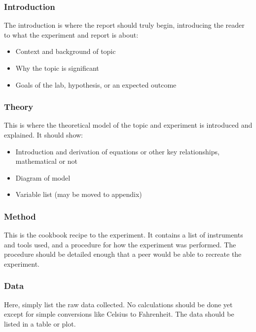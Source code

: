 \documentclass{bannerReport}
\begin{document}
			\subsubsection{Introduction}
				The introduction is where the report should truly begin, introducing the reader to what the experiment and report is about:
				\begin{itemize}
					\item Context and background of topic
					\item Why the topic is significant
					\item Goals of the lab, hypothesis, or an expected outcome
				\end{itemize}

			\subsubsection{Theory}
				This is where the theoretical model of the topic and experiment is introduced and explained. It should show:
				\begin{itemize}
					\item Introduction and derivation of equations or other key relationships, mathematical or not
					\item Diagram of model
					\item Variable list (may be moved to appendix)	
				\end{itemize}

			\subsubsection{Method}
				This is the cookbook recipe to the experiment. It contains a list of instruments and tools used, and a procedure for how the experiment was performed. The procedure should be detailed enough that a peer would be able to recreate the experiment.

			\subsubsection{Data}
				Here, simply list the raw data collected. No calculations should be done yet except for simple conversions like Celsius to Fahrenheit. The data should be listed in a table or plot.
\end{document}

